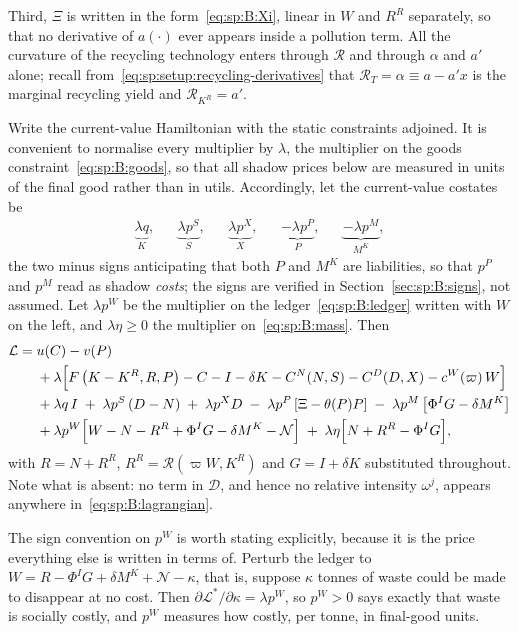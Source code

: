 Third, $\Xi$ is written in the form~\eqref{eq:sp:B:Xi}, linear in $W$ and $R^R$ separately, so that no
derivative of $a(\cdot)$ ever appears inside a pollution term. All the curvature of the recycling
technology enters through $\mathcal R$ and through $\alpha$ and $a'$ alone; recall
from~\eqref{eq:sp:setup:recycling-derivatives} that $\mathcal R_T=\alpha\equiv a-a'x$ is the marginal
recycling yield and $\mathcal R_{K^R}=a'$.

 Write the current-value Hamiltonian with the static constraints adjoined.
It is convenient to normalise every multiplier by $\lambda$, the multiplier on the goods
constraint~\eqref{eq:sp:B:goods}, so that all shadow prices below are measured in units of the final
good rather than in utils. Accordingly, let the current-value costates be
\begin{align}
\underbrace{\lambda q}_{K},
&&
\underbrace{\lambda p^S}_{S},
&&
\underbrace{\lambda p^X}_{X},
&&
\underbrace{-\lambda p^P}_{P},
&&
\underbrace{-\lambda p^M}_{M^K},
\label{eq:sp:B:costates-def}
\end{align}
the two minus signs anticipating that both $P$ and $M^K$ are liabilities, so that $p^P$ and $p^M$ read
as shadow \emph{costs}; the signs are verified in Section~\ref{sec:sp:B:signs}, not assumed. Let
$\lambda p^W$ be the multiplier on the ledger~\eqref{eq:sp:B:ledger} written with $W$ on the left, and
$\lambda\eta\ge0$ the multiplier on~\eqref{eq:sp:B:mass}. Then
\begin{align}
\mathcal L
={}& u(C)-v(P)
\notag\\
&+\lambda\Big[F\left(K-K^R,R,P\right)-C-I-\delta K-C^N(N,S)-C^D(D,X)-c^W\!\left(\varpi\right)W\Big]
\notag\\
&+\lambda q\,I
\;+\;\lambda p^S\left(D-N\right)
\;+\;\lambda p^X D
\;-\;\lambda p^P\left[\Xi-\theta(P)P\right]
\;-\;\lambda p^M\left[\Phi^IG-\delta M^K\right]
\notag\\
&+\lambda p^W\Big[W-N-R^R+\Phi^IG-\delta M^K-\mathcal N\Big]
\;+\;\lambda\eta\Big[N+R^R-\Phi^IG\Big],
\label{eq:sp:B:lagrangian}
\end{align}
with $R=N+R^R$, $R^R=\mathcal R\left(\varpi W,K^R\right)$ and $G=I+\delta K$ substituted throughout.
Note what is absent: no term in $\mathcal D$, and hence no relative intensity $\omega^j$, appears
anywhere in~\eqref{eq:sp:B:lagrangian}.

The sign convention on $p^W$ is worth stating explicitly, because it is the price everything else is
written in terms of. Perturb the ledger to $W=R-\Phi^IG+\delta M^K+\mathcal N-\kappa$, that is, suppose
$\kappa$ tonnes of waste could be made to disappear at no cost. Then
$\partial\mathcal L^*/\partial\kappa=\lambda p^W$, so $p^W>0$ says exactly that waste is socially
costly, and $p^W$ measures how costly, per tonne, in final-good units.


